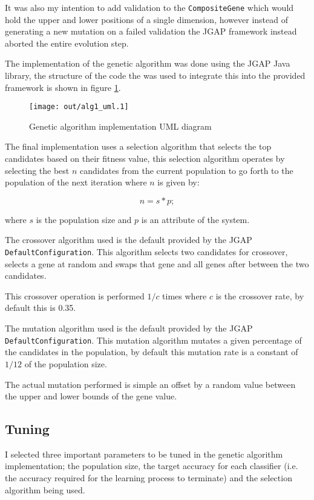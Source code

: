 \documentclass[a4paper]{article}
\begin{document}
It was also my intention to add validation to the \texttt{CompositeGene} which
would hold the upper and lower positions of a single dimension, however instead
of generating a new mutation on a failed validation the JGAP framework instead
aborted the entire evolution step.

The implementation of the genetic algorithm was done using the JGAP \cite{jgap}
Java library, the structure of the code the was used to integrate this into the
provided framework is shown in figure \ref{fig:ga_uml}.

\begin{figure}[h!]
  \centering
  \texttt{[image: out/alg1\_uml.1]}
  \caption{Genetic algorithm implementation UML diagram}
  \label{fig:ga_uml}
\end{figure}

The final implementation uses a selection algorithm that selects the top
candidates based on their fitness value, this selection algorithm operates by
selecting the best $n$ candidates from the current population to go forth to the
population of the next iteration where $n$ is given by:

\[
  n = s * p;
\]

where $s$ is the population size and $p$ is an attribute of the system.

The crossover algorithm used is the default provided by the JGAP
\texttt{DefaultConfiguration}. This algorithm selects two candidates for
crossover, selects a gene at random and swaps that gene and all genes after
between the two candidates.

This crossover operation is performed $1/c$ times where $c$ is the crossover
rate, by default this is 0.35.

The mutation algorithm used is the default provided by the JGAP
\texttt{DefaultConfiguration}. This mutation algorithm mutates a given
percentage of the candidates in the population, by default this mutation rate is
a constant of $1/12$ of the population size.

The actual mutation performed is simple an offset by a random value between the
upper and lower bounds of the gene value.

\subsection{Tuning}
\label{sec:ga_tuning}

I selected three important parameters to be tuned in the genetic algorithm
implementation; the population size, the target accuracy for each classifier
(i.e. the accuracy required for the learning process to terminate) and the
selection algorithm being used.
\end{document}

